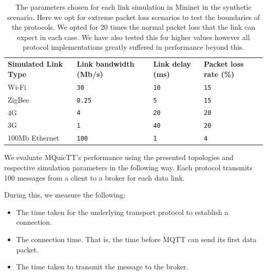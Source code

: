 \begin{table}[ht]
    \caption{The parameters chosen for each link simulation in Mininet in the synthetic scenario. Here we opt for extreme packet loss scenarios to test the boundaries of the protocols. We opted for 20 times the normal packet loss that the link can expect in each case. We have also tested this for higher values however all protocol implementations greatly suffered in performance beyond this.}\label{tab:links:synth}
    \begin{tabular}{@{}llll@{}}
        \toprule
        \textbf{Simulated Link Type} & \textbf{Link bandwidth (Mb/s)} & \textbf{Link delay (ms)} & \textbf{Packet loss rate (\%)} \\
        Wi-Fi                        & \texttt{30}                    & \texttt{10}              & \texttt{15}                     \\
        ZigBee                       & \texttt{0.25}                  & \texttt{5}               & \texttt{15}                     \\
        4G                           & \texttt{4}                     & \texttt{20}              & \texttt{20}                   \\
        3G                           & \texttt{1}                     & \texttt{40}              & \texttt{20}                   \\
        100Mb Ethernet               & \texttt{100}                   & \texttt{1}               & \texttt{4}                   \\
        \bottomrule
    \end{tabular}
\end{table}

We evaluate MQuicTT's performance using the presented topologies and respective simulation parameters in the following way.
Each protocol transmits 100 messages from a client to a broker for each data link.

During this, we measure the following:

\begin{itemize}
    \item The time taken for the underlying transport protocol to establish a connection.
    \item The connection time. That is, the time before MQTT can send its first data packet.
    \item The time taken to transmit the message to the broker.
\end{itemize}


